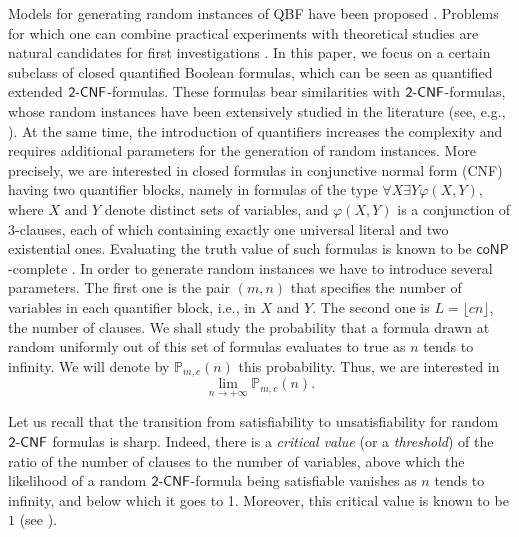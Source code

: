 \documentclass[aop,noinfoline]{imsart}
\newcommand{\twocnf}{\mbox{\sf 2-CNF}}
\newcommand{\conp}{\mathsf{coNP}}
\newcommand{\pmLu}{\mathbb{P}_{m,c}}
\begin{document}
 Models for
generating random instances of QBF have been proposed \cite{GentW-99,ChenI-05}.
Problems for which one can combine practical experiments with
 theoretical studies are natural candidates for first investigations
 \cite{CreignouDE-07}. In this paper, we focus on a certain subclass
 of closed quantified Boolean formulas, which can be seen as
 quantified extended $\twocnf$-formulas. These formulas bear
 similarities with $\twocnf$-formulas, whose random instances have
 been extensively studied in the literature (see, e.g.,
 \cite{ChvatalR-92, Goerdt-96, Verhoeven-99, Bollobasetal01,
   Vega-01}). At the same time, the introduction of quantifiers
 increases the complexity and requires additional parameters for the
 generation of random instances.  More precisely, we are interested in
 closed formulas in conjunctive normal form (CNF) having two quantifier
 blocks, namely in formulas of the type $\forall X \exists Y
 \varphi(X,Y)$, where $X$ and $Y$ denote distinct sets of variables,
 and $\varphi(X,Y)$ is a conjunction of 3-clauses, each of which
 containing exactly one universal literal and two existential
 ones. Evaluating the truth value of such formulas is known to be
 $\conp$-complete \cite{FloegelKKB-90}. In order to generate random
 instances we have to introduce several parameters.  The first one is
 the pair $(m,n)$ that specifies the number of variables in each
 quantifier block, i.e., in $X$ and $Y$.  The second one is $
 L=\lfloor cn\rfloor$, the number of clauses. We shall study the
 probability that a formula drawn at random uniformly out of this set
 of formulas evaluates to true as $n$ tends to infinity. We will
 denote by $\pmLu(n)$ this probability. Thus, we are interested in
$$\lim_{n\rightarrow +\infty} \pmLu(n).$$

Let us recall that the transition from satisfiability to
unsatisfiability for random $\twocnf$ formulas is sharp. Indeed, there
is a \emph{ critical value} (or a \emph{threshold}\/) of the ratio of
the number of clauses to the number of variables, above which the
likelihood of a random $\twocnf$-formula being satisfiable vanishes as
$n$ tends to infinity, and below which it goes to 1. Moreover, this
critical value is known to be $1$ (see \cite{ChvatalR-92, Goerdt-96}).
\end{document}
